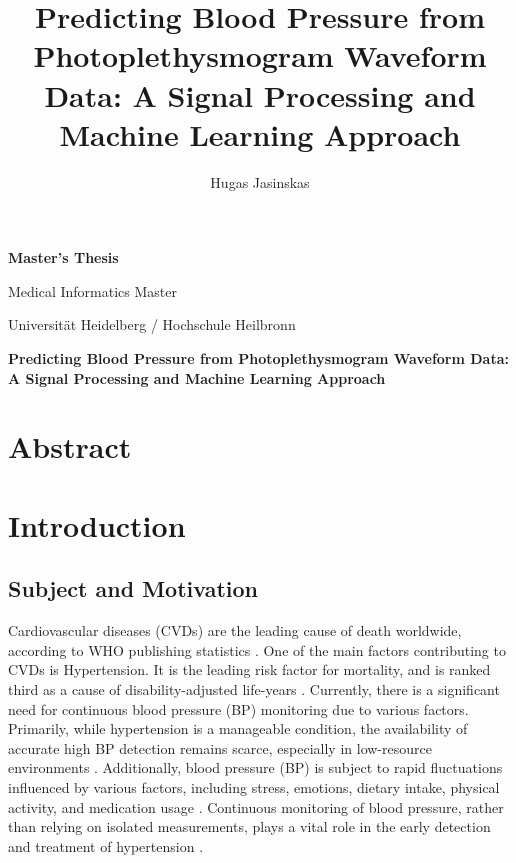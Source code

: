 \documentclass[12pt, bibliography=totoc]{scrartcl}
\title{Predicting Blood Pressure from Photoplethysmogram Waveform Data: A Signal Processing and
Machine Learning Approach}
\author{Hugas Jasinskas}
\begin{document}
\begin{titlepage}
\begin{center}
        \vspace*{1cm}
            
        \Huge
        \textbf{Master's Thesis}
            
        \vspace{0.5cm}
        \Large
        Medical Informatics Master
        
        \vspace{0.5cm}
        \Large
        Universität Heidelberg / Hochschule Heilbronn
        
        \hrulefill
            
        \vspace{1.5cm}
        
        \Huge
        \textbf{Predicting Blood Pressure from Photoplethysmogram Waveform Data: A Signal Processing and
Machine Learning Approach}
        
    \end{center}
    
\end{titlepage}

\newpage

\tableofcontents

\newpage
\onehalfspacing
\section{Abstract}
\section{Introduction}
\subsection{Subject and Motivation}

Cardiovascular diseases (CVDs) are the leading cause of death worldwide, according to WHO publishing statistics \cite{organizationWorldHealthStatistics2023}. One of the main factors contributing to CVDs is Hypertension.
It is the leading risk factor for mortality, and is ranked third as a cause of disability-adjusted life-years \cite{ezzatiSelectedMajorRisk2002}.
Currently, there is a significant need for continuous blood pressure (BP) monitoring due to various factors. Primarily, while hypertension is a manageable condition, the availability of accurate high BP detection remains scarce, especially in low-resource environments \cite{burtPrevalenceHypertensionUS1995}. 
Additionally, blood pressure (BP) is subject to rapid fluctuations influenced by various factors, including stress, emotions, dietary intake, physical activity, and medication usage \cite{poonCufflessNoninvasiveMeasurements2005}.
Continuous monitoring of blood pressure, rather than relying on isolated measurements, plays a vital role in the early detection and treatment of hypertension  \cite{el-hajjDeepLearningModels2021}.
\end{document}
